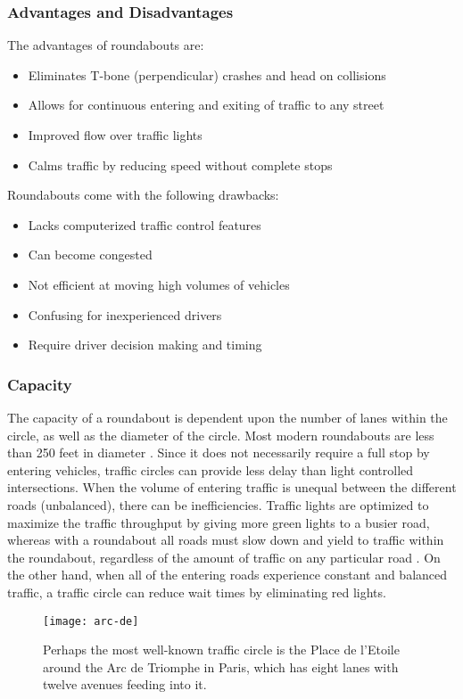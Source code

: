 \subsubsection{Advantages and Disadvantages}
The advantages of roundabouts are:\begin{itemize}
	\item Eliminates T-bone (perpendicular) crashes and head on collisions
	\item Allows for continuous entering and exiting of traffic to any street
	\item Improved flow over traffic lights
	\item Calms traffic by reducing speed without complete stops
\end{itemize}

Roundabouts come with the following drawbacks:\begin{itemize}
	\item Lacks computerized traffic control features
	\item Can become congested
	\item Not efficient at moving high volumes of vehicles
	\item Confusing for inexperienced drivers
	\item Require driver decision making and timing
\end{itemize}

\subsubsection{Capacity}
The capacity of a roundabout is dependent upon the number of lanes within the circle, as well as the diameter of the circle.  Most modern roundabouts are less than 250 feet in diameter \cite{rabout1}.  Since it does not necessarily require a full stop by entering vehicles, traffic circles can provide less delay than light controlled intersections.  When the volume of entering traffic is unequal between the different roads (unbalanced), there can be inefficiencies.  Traffic lights are optimized to maximize the traffic throughput by giving more green lights to a busier road, whereas with a roundabout all roads must slow down and yield to traffic within the roundabout, regardless of the amount of traffic on any particular road \cite{rabout4}.  On the other hand, when all of the entering roads experience constant and balanced traffic, a traffic circle can reduce wait times by eliminating red lights.  

\begin{figure}[!htbp]
\centering
\texttt{[image: arc-de]}
\caption[Place de l'Etoile]{Perhaps the most well-known traffic circle is the Place de l'Etoile around the Arc de Triomphe in Paris, which has eight lanes with twelve avenues feeding into it.}\label{fig:arc-de}
\end{figure}

